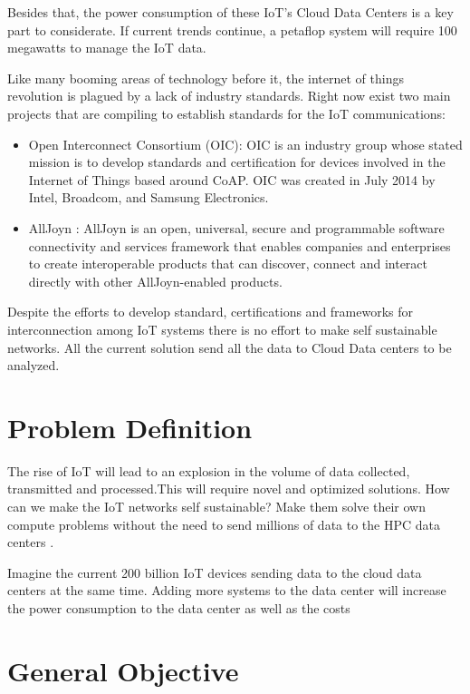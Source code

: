Besides that, the power consumption of these  IoT’s Cloud Data Centers is a key
part to considerate. If current trends continue, a petaflop system will require 
100 megawatts to manage the IoT data. 

Like many booming areas of technology before it, the internet of things
revolution is plagued by a lack of industry standards. Right now exist two main 
projects that are compiling to establish standards for the IoT communications: 

\begin{itemize}
\item Open Interconnect Consortium (OIC): OIC is an industry group whose stated 
mission is to develop standards and certification for devices involved in the 
Internet of Things based around CoAP. OIC was created in July 2014 by Intel, 
Broadcom, and Samsung Electronics.
\item AllJoyn : AllJoyn is an open, universal, secure and programmable software 
connectivity and services framework that enables companies and enterprises to 
create interoperable products that can discover, connect and interact directly 
with other AllJoyn-enabled products.
\end{itemize}

Despite the efforts to develop standard, certifications and frameworks for 
interconnection among IoT systems there is no effort to make self sustainable 
networks. All the current solution send all the data to Cloud Data centers to be 
analyzed. 

\section{Problem Definition}
\noindent

The rise of IoT will lead to an explosion in the volume of data collected, 
transmitted and processed.This will require novel and optimized solutions. 
How can we make the IoT networks self sustainable? Make them solve their own compute problems 
without the need to send millions of data to the HPC data centers . 

Imagine the current 200 billion IoT devices sending data to the cloud data 
centers at the same time. Adding more systems to the data center will increase 
the power consumption to the data center as well as the costs

\section{General Objective}
\noindent

